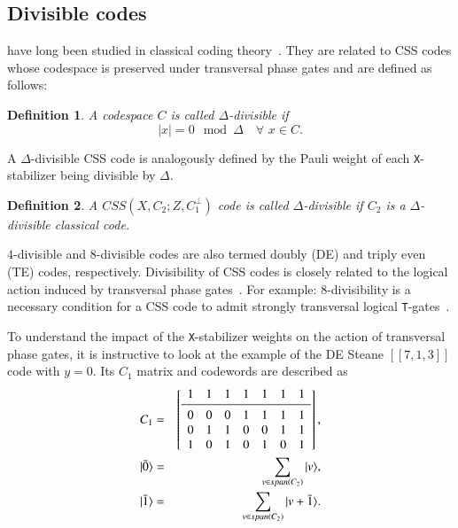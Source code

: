 \documentclass[journal]{IEEEtran}
\newcommand{\T}{\texttt{T}}
\newcommand{\X}{\texttt{X}}
\newtheorem{definition}{Definition}[section]
\begin{document}
\subsection{Divisible codes}\label{subsec:divisible-codes}
 have long been studied in classical coding theory~\cite{macwilliams_theory_1977,  ward_divisible_1981, betsumiya_triply_2012,kurz_divisible_2023}.
They are related to CSS codes whose codespace is preserved under transversal phase gates and are defined as follows:
\begin{definition}
    A codespace $C$ is called $\Delta$-divisible if
    \begin{equation}
        |x|=0\mod{\Delta} \quad \forall \,\,x\in C.
    \end{equation}
\end{definition}
A $\Delta$-divisible CSS code is analogously defined by the Pauli weight of each \X-stabilizer being divisible by $\Delta$.
\begin{definition}
    A $CSS(X,C_2;Z,C_1^\perp)$ code is called $\Delta$-divisible if $C_2$ is a $\Delta$-divisible classical code.
\end{definition}
$4$-divisible and $8$-divisible codes are also termed doubly (DE) and triply even (TE) codes, respectively. 
Divisibility of CSS codes is closely related to the logical action induced by transversal phase gates~\cite{hu_divisible_2022,landahl_complex_2013,campbell_unified_2017,haah_codes_2018}. For example: $8$-divisibility is a necessary condition for a CSS code to admit strongly transversal logical \T-gates~\cite{rengaswamy_optimality_2020}. 

To understand the impact of the \X-stabilizer weights on the action of transversal phase gates, it is instructive to look at the example of the DE Steane $[[7,1,3]]$ code with $y=0$. Its $C_1$ matrix and codewords are described as
\begin{eqnarray}
    C_1 &=& \left[\begin{array}{ccccccc}
   1 & 1 & 1 & 1 & 1 & 1 & 1 \\
   \midrule 
   0 & 0 & 0 & 1 & 1 & 1 & 1  \\
   0 & 1 & 1 & 0 & 0 & 1 & 1\\
    1 & 0 & 1 & 0 & 1 & 0 & 1\\
\end{array}\right], \\
|\bar{0}\rangle &=& \sum_{v\in \textrm{span}(C_2)} |v\rangle, \\
    |\bar{1}\rangle &=& \sum_{v\in \textrm{span}(C_2)} |v+\bar{1}\rangle .
\end{eqnarray} 
\end{document}
